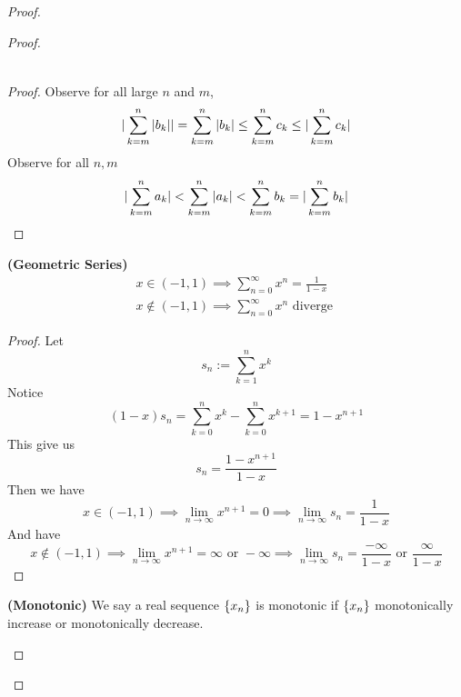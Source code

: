 \documentclass{report}
\begin{document}
\begin{proof}
\begin{proof}
\begin{theorem}
\begin{gather}
\end{gather}
\end{theorem}
\begin{proof}
Observe for all large $n$ and $m$,
\begin{equation}
|\sum_{k=m}^n |b_k||=\sum_{k=m}^n |b_k|\leq \sum_{k=m}^n c_k\leq |\sum_{k=m}^n c_k|
\end{equation}
Observe for all $n,m$
\begin{equation}
|\sum_{k=m}^n a_k|<\sum_{k=m}^n |a_k|<\sum_{k=m}^n b_k=|\sum_{k=m}^n b_k|
\end{equation}
\end{proof}
\begin{theorem}
\label{4.3.8}
\textbf{(Geometric Series)} 
\begin{align}
x\in (-1,1)\implies \sum_{n=0}^\infty x^n=\frac{1}{1-x}\\
x\not\in (-1,1)\implies \sum_{n=0}^\infty x^n\text{ diverge }
\end{align}
\end{theorem}
\begin{proof}
Let 
\begin{equation}
s_n:=\sum_{k=1}^n x^k
\end{equation}
Notice
\begin{equation}
  (1-x)s_n=\sum_{k=0}^n x^k-\sum_{k=0}^n x^{k+1}=1-x^{n+1}
\end{equation}
This give us
\begin{equation}
s_n=\frac{1-x^{n+1}}{1-x}
\end{equation}
Then we have
\begin{equation}
x\in (-1,1)\implies \lim_{n\to\infty}x^{n+1}=0\implies \lim_{n\to\infty}s_n=\frac{1}{1-x}
\end{equation}
And have
\begin{equation}
x\not\in (-1,1)\implies \lim_{n\to\infty}x^{n+1}=\infty\text{ or }-\infty\implies \lim_{n\to\infty}s_n= \frac{-\infty}{1-x}\text{ or }\frac{\infty}{1-x}
\end{equation}
\end{proof}
\begin{definition}
\label{4.3.9}
\textbf{(Monotonic)} We say a real sequence $\{ x_n \}$ is monotonic if $\{ x_n \}$ monotonically increase or monotonically decrease.

\end{definition}
\end{proof}
\end{proof}
\end{document}
